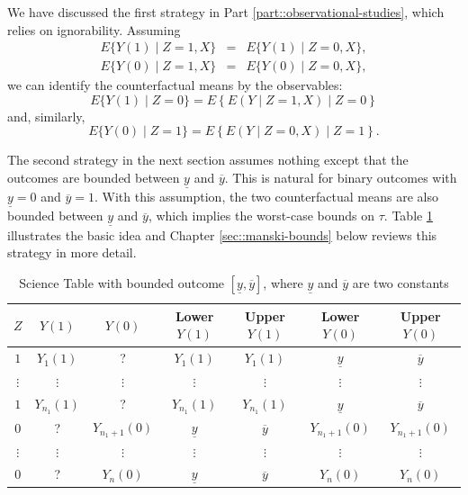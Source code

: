 We have discussed the first strategy in Part \ref{part::observational-studies}, which relies on ignorability. 
Assuming
\begin{eqnarray*}
E\{ Y(1)\mid Z=1, X \} &=& E\{ Y(1)\mid Z=0, X \} ,\\ 
E\{ Y(0)\mid Z=1, X \} &=& E\{ Y(0)\mid Z=0, X \}, 
\end{eqnarray*}
we can identify the counterfactual means by the observables:
$$
E\{ Y(1)\mid Z=0 \}  
= E\left\{  E( Y\mid Z=1, X )  \mid Z=0\right\}
$$
and, similarly, 
$$
E\{ Y(0)\mid Z=1\} = E\left\{  E( Y\mid Z=0, X )  \mid Z=1\right\} . 
$$



The second strategy in the next section assumes nothing except that the outcomes are bounded between $\underline{y}$ and $\overline{y}$. 
This is natural for binary outcomes with $\underline{y} = 0$ and $\overline{y} = 1$. 
With this assumption, the two counterfactual means are also bounded between $\underline{y}$ and $\overline{y}$, which implies the worst-case bounds on $\tau$. 
Table \ref{table::manski-bounds} illustrates the basic idea and Chapter \ref{sec::manski-bounds} below reviews this strategy in more detail. 


 


 



\begin{table}
\centering
\caption{Science Table with bounded outcome $ [\underline{y}, \overline{y}]$, where $\underline{y}$ and $\overline{y}$ are two constants}\label{table::manski-bounds}
\begin{tabular}{ccccccc}
\hline 
$Z$ & $Y(1)$ & $Y(0)$ &  Lower $Y(1)$ & Upper $Y(1)$ & Lower $Y(0)$ & Upper $Y(0)$ \\
\hline 
$1$ & $Y_1(1)$ & ? & $Y_1(1)$  & $Y_1(1)$ & $\underline{y}$ & $\overline{y}$ \\
$\vdots$&$\vdots$&$\vdots$&$\vdots$&$\vdots$&$\vdots$&$\vdots$   \\
$1$ & $Y_{n_1}(1)$ & ? &  $Y_{n_1}(1)$  & $Y_{n_1}(1)$ & $\underline{y}$ & $\overline{y}$ \\
\hline 
$0$ & ? & $Y_{n_1+1}(0)$ & $\underline{y}$ & $\overline{y}$& $Y_{n_1+1}(0)$ & $Y_{n_1+1}(0)$ \\ 
$\vdots$&$\vdots$&$\vdots$&$\vdots$&$\vdots$&$\vdots$&$\vdots$ \\ 
$0$ & ? & $Y_{n}(0)$ & $\underline{y}$ & $\overline{y}$& $Y_{n}(0)$ & $Y_{n}(0)$ \\
\hline 
\end{tabular}
\end{table}


